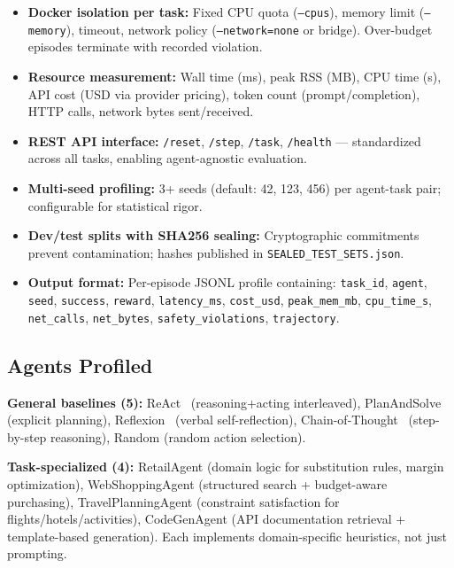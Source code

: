 \documentclass[letterpaper, 10 pt, conference]{ieeeconf}
\begin{document}
\begin{itemize}
    \item \textbf{Docker isolation per task:} Fixed CPU quota (\texttt{--cpus}), memory limit (\texttt{--memory}), timeout, network policy (\texttt{--network=none} or bridge). Over-budget episodes terminate with recorded violation.
    \item \textbf{Resource measurement:} Wall time (ms), peak RSS (MB), CPU time (s), API cost (USD via provider pricing), token count (prompt/completion), HTTP calls, network bytes sent/received.
    \item \textbf{REST API interface:} \texttt{/reset}, \texttt{/step}, \texttt{/task}, \texttt{/health} --- standardized across all tasks, enabling agent-agnostic evaluation.
    \item \textbf{Multi-seed profiling:} 3+ seeds (default: 42, 123, 456) per agent-task pair; configurable for statistical rigor.
    \item \textbf{Dev/test splits with SHA256 sealing:} Cryptographic commitments prevent contamination; hashes published in \texttt{SEALED\_TEST\_SETS.json}.
    \item \textbf{Output format:} Per-episode JSONL profile containing: \texttt{task\_id}, \texttt{agent}, \texttt{seed}, \texttt{success}, \texttt{reward}, \texttt{latency\_ms}, \texttt{cost\_usd}, \texttt{peak\_mem\_mb}, \texttt{cpu\_time\_s}, \texttt{net\_calls}, \texttt{net\_bytes}, \texttt{safety\_violations}, \texttt{trajectory}.
\end{itemize}

\subsection{Agents Profiled}
\label{sec:agents}

\textbf{General baselines (5):} ReAct~\cite{yao2022react} (reasoning+acting interleaved), PlanAndSolve~\cite{wang2023planandsolve} (explicit planning), Reflexion~\cite{shinn2023reflexion} (verbal self-reflection), Chain-of-Thought~\cite{wei2022cot} (step-by-step reasoning), Random (random action selection).

\textbf{Task-specialized (4):} RetailAgent (domain logic for substitution rules, margin optimization), WebShoppingAgent (structured search + budget-aware purchasing), TravelPlanningAgent (constraint satisfaction for flights/hotels/activities), CodeGenAgent (API documentation retrieval + template-based generation). Each implements domain-specific heuristics, not just prompting.
\end{document}
